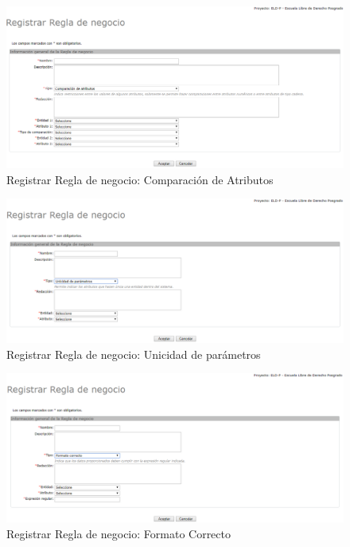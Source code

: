 \begin{enumerate}
			\begin{figure}[H]
				\begin{center}
					\includegraphics[scale=0.5]{roles/lider/reglasNegocio/pantallas/IU8-1AregistrarBR}
					\caption{Registrar Regla de negocio: Comparación de Atributos}
					\label{fig:registrarBRA}
				\end{center}
			\end{figure}
			
			\begin{figure}[H]
				\begin{center}
					\includegraphics[scale=0.5]{roles/lider/reglasNegocio/pantallas/IU8-1BregistrarBR}
					\caption{Registrar Regla de negocio: Unicidad de parámetros}
					\label{fig:registrarBRB}
				\end{center}
			\end{figure}
			
			\begin{figure}[H]
				\begin{center}
					\includegraphics[scale=0.5]{roles/lider/reglasNegocio/pantallas/IU8-1CregistrarBR}
					\caption{Registrar Regla de negocio: Formato Correcto}
					\label{fig:registrarBRC}
				\end{center}
			\end{figure}
			

\end{enumerate}
